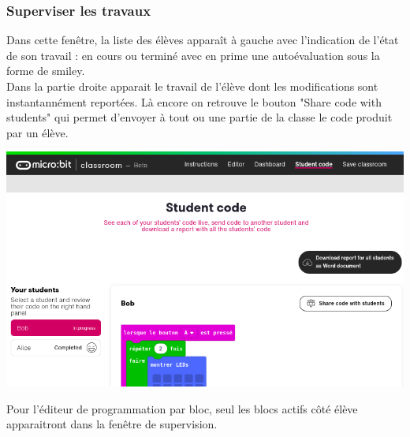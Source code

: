 \vspace{5mm}

\subsubsection{Superviser les travaux}

\begin{methode}
        Dans cette fenêtre, la liste des élèves apparaît à gauche avec l'indication 
        de l'état de son travail : en cours ou terminé avec en prime une autoévaluation sous la
        forme de smiley.\\
        Dans la partie droite apparait le travail de l'élève dont les modifications sont instantannément
        reportées. Là encore on retrouve le bouton "Share code with students" qui permet d'envoyer à tout
        ou une partie de la classe le code produit par un élève.

    \vspace{5mm}
    
    \centerline{\includegraphics[width=0.6\linewidth]{res/classroom_studentCode2.png}}
    


\end{methode}

\begin{remarque}
    Pour l'éditeur de programmation par bloc, seul les blocs actifs côté élève
    apparaitront dans la fenêtre de supervision.

    
\end{remarque}


